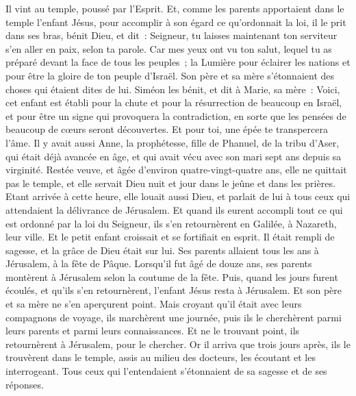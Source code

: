 \begin{multicols}{2}
Il vint au temple, poussé par l'Esprit. Et, comme les parents apportaient dans le temple l'enfant Jésus, pour accomplir à son égard ce qu'ordonnait la loi,
il le prit dans ses bras, bénit Dieu, et dit~:
Seigneur, tu laisses maintenant ton serviteur s'en aller en paix, selon ta parole.
Car mes yeux ont vu ton salut,
lequel tu as préparé devant la face de tous les peuples~;
la Lumière pour éclairer les nations et pour être la gloire de ton peuple d'Israël.
Son père et sa mère s'étonnaient des choses qui étaient dites de lui.
Siméon les bénit, et dit à Marie, sa mère~: Voici, cet enfant est établi pour la chute et pour la résurrection de beaucoup en Israël, et pour être un signe qui provoquera la contradiction,
en sorte que les pensées de beaucoup de cœurs seront découvertes. Et pour toi, une épée te transpercera l'âme.
Il y avait aussi Anne, la prophétesse, fille de Phanuel, de la tribu d'Aser, qui était déjà avancée en âge, et qui avait vécu avec son mari sept ans depuis sa virginité.
Restée veuve, et âgée d'environ quatre-vingt-quatre ans, elle ne quittait pas le temple, et elle servait Dieu nuit et jour dans le jeûne et dans les prières.
Etant arrivée à cette heure, elle louait aussi Dieu, et parlait de lui à tous ceux qui attendaient la délivrance de Jérusalem.
Et quand ils eurent accompli tout ce qui est ordonné par la loi du Seigneur, ils s'en retournèrent en Galilée, à Nazareth, leur ville.
Et le petit enfant croissait et se fortifiait en esprit. Il était rempli de sagesse, et la grâce de Dieu était sur lui.
Ses parents allaient tous les ans à Jérusalem, à la fête de Pâque.
Lorsqu'il fut âgé de douze ans, ses parents montèrent à Jérusalem selon la coutume de la fête.
Puis, quand les jours furent écoulés, et qu'ils s'en retournèrent, l'enfant Jésus resta à Jérusalem. Et son père et sa mère ne s'en aperçurent point.
Mais croyant qu'il était avec leurs compagnons de voyage, ils marchèrent une journée, puis ils le cherchèrent parmi leurs parents et parmi leurs connaissances.
Et ne le trouvant point, ils retournèrent à Jérusalem, pour le chercher.
Or il arriva que trois jours après, ils le trouvèrent dans le temple, assis au milieu des docteurs, les écoutant et les interrogeant.
Tous ceux qui l'entendaient s'étonnaient de sa sagesse et de ses réponses.

\end{multicols}
